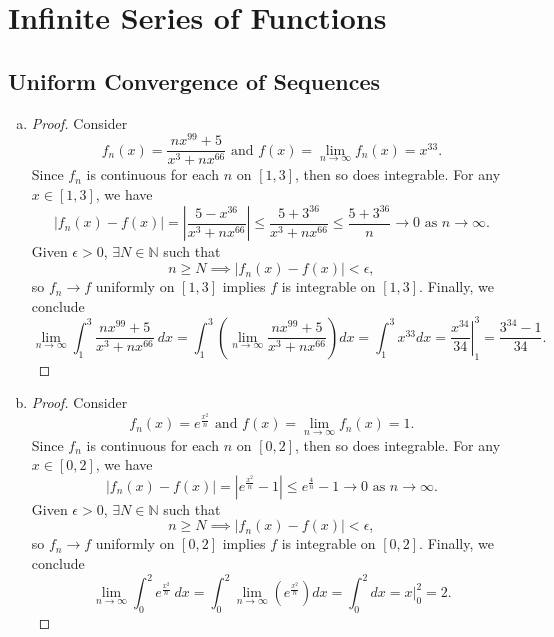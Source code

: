 \documentclass{report}
\begin{document}

\setcounter{chapter}{6}
\chapter{Infinite Series of Functions}
\thispagestyle{empty}
\newpage

\section{Uniform Convergence of Sequences}
\setcounter{Exercise}{1}
\begin{Exercise}
\begin{enumerate}[a)]
\item 
\begin{proof}
Consider $$f_n(x) = \frac{n x^{99}+5}{x^3+n x^{66}}\text{ and } f(x)=\lim_{n\to\infty}f_n(x) = x^{33}.$$
Since $f_n$ is continuous for each $n$ on $[1,3]$, then so does integrable.
For any $x\in[1, 3]$, we have $$ \left| f_n(x) - f(x) \right| =
\left| \frac{5-x^{36}}{x^3+n x^{66}} \right| \leq
\frac{5+3^{36}}{x^3+n x^{66}} \leq
\frac{5+3^{36}}{n}\to0 \mbox{ as } n\to\infty.$$
Given $\epsilon > 0$, $\exists N\in\mathbb{N}$ such that $$n \geq N \implies \left| f_n(x) - f(x) \right| < \epsilon,$$
so $f_n \to f$ uniformly on $[1,3]$ implies $f$ is integrable on $[1,3]$. Finally, we conclude $$\lim_{n\to\infty}\int_{1}^{3} \frac{n x^{99}+5}{x^3+n x^{66}}\ dx =
\int_{1}^{3}\left( \lim_{n\to\infty}\frac{n x^{99}+5}{x^3+n x^{66}}\right)dx =
\int_{1}^{3}x^{33} dx =
\left. \frac{x^{34}}{34} \right|_{1}^{3} =
\frac{3^{34}-1}{34}.$$ 
\end{proof}

\item
\begin{proof}
Consider $$f_n(x) = e^{\frac{x^2}{n}}\text{ and } f(x)=\lim_{n\to\infty}f_n(x) = 1.$$
Since $f_n$ is continuous for each $n$ on $[0,2]$, then so does integrable.
For any $x\in[0, 2]$, we have $$ \left| f_n(x) - f(x) \right| =
\left| e^{\frac{x^2}{n}}-1 \right| \leq
e^{\frac{4}{n}}-1\to 0\mbox{ as } n\to\infty.$$
Given $\epsilon > 0$, $\exists N\in\mathbb{N}$ such that $$n \geq N \implies \left| f_n(x) - f(x) \right| < \epsilon,$$
so $f_n \to f$ uniformly on $[0,2]$ implies $f$ is integrable on $[0,2]$. Finally, we conclude $$\lim_{n\to\infty}\int_{0}^{2} e^{\frac{x^2}{n}}\ dx =
\int_{0}^{2} \lim_{n\to\infty}\left( e^{\frac{x^2}{n} }\right) dx =
\int_{0}^{2} dx =
\left. x \right|_{0}^{2} =
2.$$
\end{proof}


\end{enumerate}
\end{Exercise}
\end{document}

